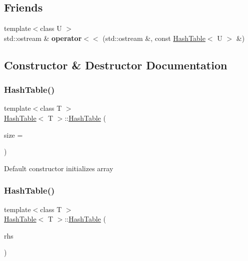 \subsection*{Friends}
\begin{DoxyCompactItemize}
\item 
\mbox{\label{classHashTable_aedd40d8c02fdaf28f43533eefff0e4f4}} 
{\footnotesize template$<$class U $>$ }\\std\+::ostream \& {\bfseries operator$<$$<$} (std\+::ostream \&, const \mbox{\hyperlink{classHashTable}{Hash\+Table}}$<$ U $>$ \&)
\end{DoxyCompactItemize}


\subsection{Constructor \& Destructor Documentation}
\mbox{\label{classHashTable_aaf597eeb450b75345dc8ec5061429d66}} 
\subsubsection{\texorpdfstring{Hash\+Table()}{HashTable()}\hspace{0.1cm}{\footnotesize\ttfamily [1/2]}}
{\footnotesize\ttfamily template$<$class T $>$ \\
\mbox{\hyperlink{classHashTable}{Hash\+Table}}$<$ T $>$\+::\mbox{\hyperlink{classHashTable}{Hash\+Table}} (\begin{DoxyParamCaption}\item[{int}]{size = {} }\end{DoxyParamCaption})}

Default constructor initializes array \mbox{\label{classHashTable_a4acb9708dd46d79a1a2aa45a64977a8b}} 
\subsubsection{\texorpdfstring{Hash\+Table()}{HashTable()}\hspace{0.1cm}{\footnotesize\ttfamily [2/2]}}
{\footnotesize\ttfamily template$<$class T $>$ \\
\mbox{\hyperlink{classHashTable}{Hash\+Table}}$<$ T $>$\+::\mbox{\hyperlink{classHashTable}{Hash\+Table}} (\begin{DoxyParamCaption}\item[{const \mbox{\hyperlink{classHashTable}{Hash\+Table}}$<$ T $>$ \&}]{rhs }\end{DoxyParamCaption})}

